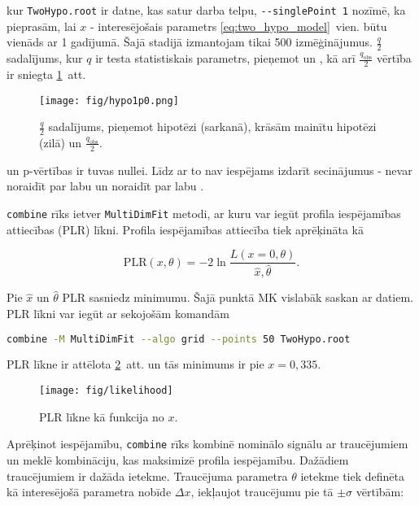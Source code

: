 \noindent kur  \lstinline[language=sh]|TwoHypo.root| ir \ROOT datne, kas satur darba telpu, \lstinline[language=sh]|--singlePoint 1| nozīmē, ka pieprasām, lai $x$ - interesējošais parametrs \ref{eq:two_hypo_model}~vien. būtu vienāds ar 1 \Halt gadījumā. Šajā stadijā izmantojam tikai 500 izmēģinājumus. $\frac{q}{2}$ sadalījums, kur $q$ ir testa statistiskais parametrs, pieņemot \Hnull un \Halt, kā arī $\frac{q_{\text{obs}}}{2}$ vērtība ir sniegta \ref{fig:hypo1p0}~att.

\begin{figure}
  \centering
  \texttt{[image: fig/hypo1p0.png]}
  \caption{$\frac{q}{2}$ sadalījums, pieņemot \ttbar hipotēzi (sarkanā), krāsām mainītu \ttbar hipotēzi (zilā) un $\frac{q_{\text{obs}}}{2}$.}
  \label{fig:hypo1p0}
\end{figure}

\Halt un \Hnull p-vērtības ir tuvas nullei. Līdz ar to nav iespējams izdarīt secinājumus - nevar noraidīt \Hnull par labu \Halt un noraidīt \Halt par labu \Hnull.

\lstinline[language=sh]|combine| rīks ietver \lstinline[language=sh]|MultiDimFit| metodi, ar kuru var iegūt profila iespējamības attiecības (PLR) līkni. Profila iespējamības attiecība tiek aprēķināta kā

\begin{equation}
  \text{PLR}(x, \theta)=-2\ln\frac{L(x=0, \theta)}{\hat{x}, \hat{\theta}}.
\end{equation}

Pie $\hat{x}$ un $\hat{\theta}$ PLR sasniedz minimumu. Šajā punktā MK vislabāk saskan ar datiem. PLR līkni var iegūt ar sekojošām komandām

\begin{lstlisting}[language=sh, breaklines=true]
combine -M MultiDimFit --algo grid --points 50 TwoHypo.root
\end{lstlisting}

PLR līkne ir attēlota \ref{fig:likelihood}~att. un tās minimums ir pie $x=0,335$.

\begin{figure}
  \centering
  \texttt{[image: fig/likelihood]}
  \caption{PLR līkne kā funkcija no $x$.}
  \label{fig:likelihood}
\end{figure}

Aprēķinot iespējamību, \lstinline[language=sh]|combine| rīks kombinē nominālo signālu ar traucējumiem un meklē kombināciju, kas maksimizē profila iespējamību. Dažādiem traucējumiem ir dažāda ietekme. Traucējuma parametra $\theta$ ietekme tiek definēta kā interesējošā parametra nobīde $\Delta x$, iekļaujot traucējumu pie tā $\pm\sigma$ vērtībām:

